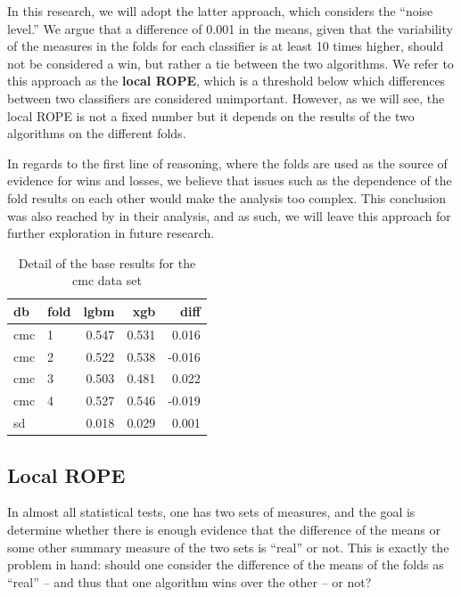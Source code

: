\documentclass[twoside,11pt,preprint]{article}
\begin{document}
In this research, we will adopt the latter approach, which considers the ``noise level.'' We argue that a difference of 0.001 in the means, given that the variability of the measures in the folds for each classifier is at least 10 times higher, should not be considered a win, but rather a tie between the two algorithms. We refer to this approach as the \textbf{local ROPE}, which is a threshold below which differences between two classifiers are considered unimportant. However, as we will see, the local ROPE is not a fixed number but it depends on the results of the two algorithms on the different folds.

In regards to the first line of reasoning, where the folds are used as the source of evidence for wins and losses, we believe that issues such as the dependence of the fold results on each other would make the analysis too complex. This conclusion was also reached by \citet{benavoli2017time} in their analysis, and as such, we will leave this approach for further exploration in future research.

\begin{table}

\caption{\label{tab:xsmall2}\label{tab:small2}Detail of the base results for the cmc data set}
\centering
\begin{tabular}[t]{llrrr}
\toprule
\textbf{db} & \textbf{fold} & \textbf{lgbm} & \textbf{xgb} & \textbf{diff}\\
\midrule
cmc & 1 & 0.547 & 0.531 & 0.016\\
cmc & 2 & 0.522 & 0.538 & -0.016\\
cmc & 3 & 0.503 & 0.481 & 0.022\\
cmc & 4 & 0.527 & 0.546 & -0.019\\
sd &  & 0.018 & 0.029 & 0.001\\
\bottomrule
\end{tabular}
\end{table}

\hypertarget{local-rope}{%
\subsection{\texorpdfstring{Local ROPE \label{localrope}}{Local ROPE }}\label{local-rope}}

In almost all statistical tests, one has two sets of measures, and the goal is
determine whether there is enough evidence that
the difference of the means or some other summary measure of the two sets is ``real'' or not. This
is exactly the problem in hand: should one consider the difference of
the means of the folds as ``real'' -- and thus that one algorithm wins over the other -- or not?
\end{document}
